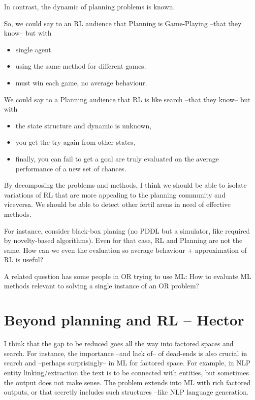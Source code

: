 \documentclass[10pt]{article}
\begin{document}
In contrast, the dynamic of planning problems is known.

So, we could say to an RL audience that Planning is Game-Playing –that they know– but with
\begin{itemize}
\item single agent
\item using the same method for different games.
\item must win each game, no average behaviour. 
\end{itemize}


We could say to a Planning audience that RL is like search –that they know– but with
\begin{itemize}
\item the state structure and dynamic is unknown, 
\item you get the try again from other states,
\item finally, you can fail to get a goal are truly evaluated on the average performance of a new set of chances.
\end{itemize}

By decomposing the problems and methods, I think we should be able to isolate
variations of RL that are more appealing to the planning community and viceversa.
We should be able to detect other fertil areas in need of effective methods.

For instance, consider black-box planing (no PDDL but a simulator, like required by novelty-based algorithms).
Even for that case, RL and Planning are not the same.
How can we even the evaluation so average behaviour + approximation of RL is useful?

A related question has some people in OR trying to use ML:
How to evaluate ML methods relevant to solving a single instance of an OR problem?

\section*{Beyond planning and RL – Hector}

I think  that the gap to be reduced goes all the way into factored spaces and search. For instance, the importance –and lack of– of dead-ends is also crucial in search and –perhaps surprisingly– in ML for factored space. For example, in NLP entity linking/extraction the text is to be connected with entities, but sometimes the output does not make sense. The problem extends into ML with rich factored outputs, or that secretly includes such structures –like NLP language generation. 
\end{document}
